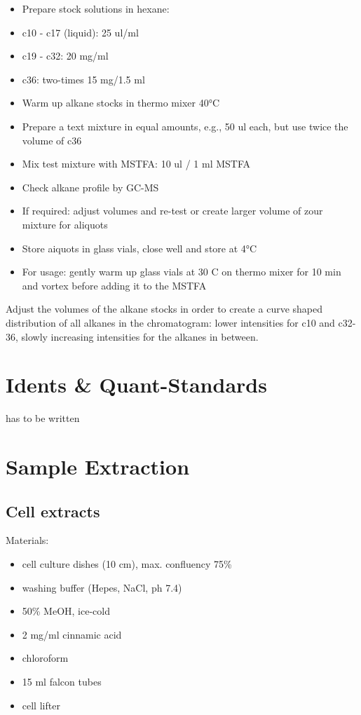 \documentclass[]{book}
\providecommand{\tightlist}{%
  \setlength{\itemsep}{0pt}\setlength{\parskip}{0pt}}
\theoremstyle{definition}
\theoremstyle{definition}
\theoremstyle{definition}
\theoremstyle{remark}
\begin{document}
\begin{itemize}
\tightlist
\item
  Prepare stock solutions in hexane:
\item
  c10 - c17 (liquid): 25 ul/ml
\item
  c19 - c32: 20 mg/ml
\item
  c36: two-times 15 mg/1.5 ml
\item
  Warm up alkane stocks in thermo mixer 40°C
\item
  Prepare a text mixture in equal amounts, e.g., 50 ul each, but use
  twice the volume of c36
\item
  Mix test mixture with MSTFA: 10 ul / 1 ml MSTFA
\item
  Check alkane profile by GC-MS
\item
  If required: adjust volumes and re-test or create larger volume of
  zour mixture for aliquots
\item
  Store aiquots in glass vials, close well and store at 4°C
\item
  For usage: gently warm up glass vials at 30 C on thermo mixer for 10
  min and vortex before adding it to the MSTFA
\end{itemize}

Adjust the volumes of the alkane stocks in order to create a curve
shaped distribution of all alkanes in the chromatogram: lower
intensities for c10 and c32-36, slowly increasing intensities for the
alkanes in between.

\section{Idents \& Quant-Standards}\label{standards}

has to be written

\section{Sample Extraction}\label{SampleExtraction}

\subsection{Cell extracts}\label{cell-extracts}

Materials:

\begin{itemize}
\tightlist
\item
  cell culture dishes (10 cm), max. confluency 75\%
\item
  washing buffer (Hepes, NaCl, ph 7.4)
\item
  50\% MeOH, ice-cold
\item
  2 mg/ml cinnamic acid
\item
  chloroform
\item
  15 ml falcon tubes
\item
  cell lifter
\end{itemize}
\end{document}
